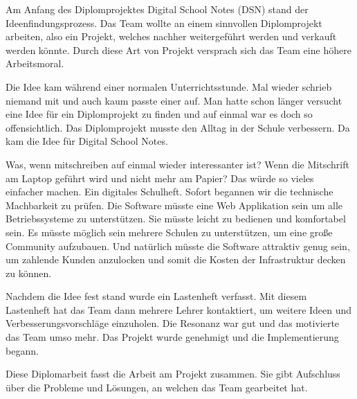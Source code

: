 
Am Anfang des Diplomprojektes Digital School Notes (\gls{DSN}) stand der Ideenfindungsprozess. Das Team wollte an einem sinnvollen Diplomprojekt arbeiten, also ein Projekt, welches nachher weitergeführt werden und verkauft werden könnte. Durch diese Art von Projekt versprach sich das Team eine höhere Arbeitsmoral. 

Die Idee kam während einer normalen Unterrichtsstunde. Mal wieder schrieb niemand mit und auch kaum passte einer auf. Man hatte schon länger versucht eine Idee für ein Diplomprojekt zu finden und auf einmal war es doch so offensichtlich. Das Diplomprojekt musste den Alltag in der Schule verbessern. Da kam die Idee für Digital School Notes.

Was, wenn mitschreiben auf einmal wieder interessanter ist? Wenn die Mitschrift am Laptop geführt wird und nicht mehr am Papier? Das würde so vieles einfacher machen. Ein digitales Schulheft. Sofort begannen wir die technische Machbarkeit zu prüfen. Die Software müsste eine Web Applikation sein um alle Betriebssysteme zu unterstützen. Sie müsste leicht zu bedienen und komfortabel sein. Es müsste möglich sein mehrere Schulen zu unterstützen, um eine große Community aufzubauen. Und natürlich müsste die Software attraktiv genug sein, um zahlende Kunden anzulocken und somit die Kosten der Infrastruktur decken zu können.

Nachdem die Idee fest stand wurde ein Lastenheft verfasst. Mit diesem Lastenheft hat das Team dann mehrere Lehrer kontaktiert, um weitere Ideen und Verbesserungsvorschläge einzuholen. Die Resonanz war gut und das motivierte das Team umso mehr. Das Projekt wurde genehmigt und die Implementierung begann.

Diese Diplomarbeit fasst die Arbeit am Projekt zusammen. Sie gibt Aufschluss über die Probleme und Lösungen, an welchen das Team gearbeitet hat.